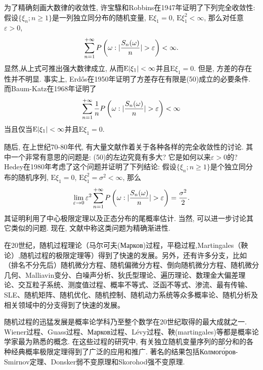 为了精确刻画大数律的收敛性, 许宝騄和Robbins在1947年证明了下列完全收敛性: 假设$\{\xi_n;n\geqslant 1\}$是一列独立同分布的随机变量, $\mathrm{E}\xi_1 = 0$, $\mathrm{E}\xi_1^2<\infty$, 那么对任意$\varepsilon>0$,\begin{equation}
\sum_{n=1}^{+\infty}P\left( \omega:\lvert\frac{S_n(\omega)}{n}\rvert>\varepsilon \right)<\infty.
\end{equation}
显然,从上式可推出强大数律成立, 从而$\mathrm{E}\lvert\xi_1\rvert<\infty$并且$\mathrm{E}\xi_1 = 0$. 但是, 方差的存在性并不明显. 事实上, Erdős在1950年证明了方差存在有限是(50)成立的必要条件. 而Baum-Katz在1968年证明了\begin{equation}
\sum_{n=1}^{+\infty}\frac{1}{n}P\left( \omega:\lvert\frac{S_n(\omega)}{n}\rvert>\varepsilon \right)<\infty
\end{equation}
当且仅当$\mathrm{E}\lvert\xi_1\rvert<\infty$并且$\mathrm{E}\xi_1 = 0$.

随后, 在上世纪70-80年代, 有大量文献作着关于各种各样的完全收敛性的讨论. 其中一个非常有意思的问题是: (50)的左边究竟有多大? 它是如何以来$\varepsilon>0$的? Hedey在1980年考虑了这个问题并证明了下列结论: 假设$\{\xi_n;n\geqslant 1\}$是个独立同分布的随机序列, $\mathrm{E}\xi_1=0$, $\mathrm{E}\xi_1^2 = \sigma^2<\infty$, 那么
\begin{equation}
\lim_{\varepsilon\to 0}\varepsilon^2\sum_{n=1}^{+\infty}P\left( \omega:\lvert\frac{S_n(\omega)}{n}\rvert>\varepsilon \right) = \frac{\sigma^2}{2}.
\end{equation}
其证明利用了中心极限定理以及正态分布的尾概率估计. 当然, 可以进一步讨论其它类似的问题. 现在, 文献中称这类问题为精确渐进性.

在20世纪，随机过程理论（马尔可夫(Марков)过程，平稳过程,Martingales（鞅论）,随机过程的极限定理等）得到了快速的发展。另外，还有许多分支，比如（排名不分先后）随机微分方程、随机偏微分方程、倒向随机微分方程、随机微分几何、Malliavin变分、白噪声分析、狄氏型理论、遍历理论、数理金大偏差理论、交互粒子系统、测度值过程、概率不等式、泛函不等式、渗流、最有传输、SLE、随机矩阵、随机优化、随机控制、随机动力系统等众多概率论、随机分析及相关领域中的分支得到了快速的发展。

随机过程的迅猛发展是概率论学科乃至整个数学在20世纪取得的最大成就之一. Wiener过程、Guass过程、Марков过程、Lévy过程、鞅(martingales)等都是概率论学家最为熟悉的概念. 在这些过程的研究中, 有关独立随机变量序列的部分和的各种经典概率极限定理得到了广泛的应用和推广. 著名的结果包括Колмого́ров-Smirnov定理、Donsker弱不变原理和Skorohod强不变原理.

